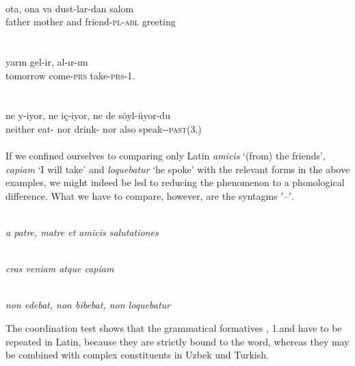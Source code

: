 \ea\label{ex:E109}
\langinfo{\LangUzb}{}{} \\
\gll ota,  ona  va  dust-lar-dan  salom\\
father  mother  and  friend-\textsc{pl}-\textsc{abl}  greeting\\
\\
\z
\noindent \ea\label{ex:E110}
\langinfo{\LangTurk}{}{} \\
\gll yarın  gel-ir,  al-ır-ım\\
tomorrow  come-\textsc{prs}  take-\textsc{prs}-1.\glgen\\
\\
\z
\noindent \ea\label{ex:E111}
\langinfo{\LangTurk}{}{}\\
\gll ne  y-iyor,  ne  iç-iyor,  ne  de  söyl-üyor-du\\
neither  {eat-\glprog}  nor  {drink-\glprog}  nor  also  speak-\glprog-\textsc{past}(3.\glgen)\\
\\
\z
\noindent If we confined ourselves to comparing only Latin \textit{amicis} ‘(from) the friends’, \textit{capiam} ‘I will take’ and \textit{loquebatur} ‘he spoke’ with the relevant forms in the above examples, we might indeed be led to reducing the phenomenon to a phonological difference. What we have to compare, however, are the syntagms $'$--$'$.

\begin{exe}
\\
\itshape a patre, matre et amicis salutationes\\
\end{exe}

\begin{exe}
\\
\itshape cras veniam atque capiam\\
\end{exe}

\begin{exe}
\\
\itshape non edebat, non bibebat, non loquebatur
\end{exe}

\noindent The coordination test shows that the grammatical formatives \glabl, 1.\glsg and \past have to be repeated in Latin, because they are strictly bound to the word, whereas they may be combined with complex constituents in Uzbek und Turkish.

